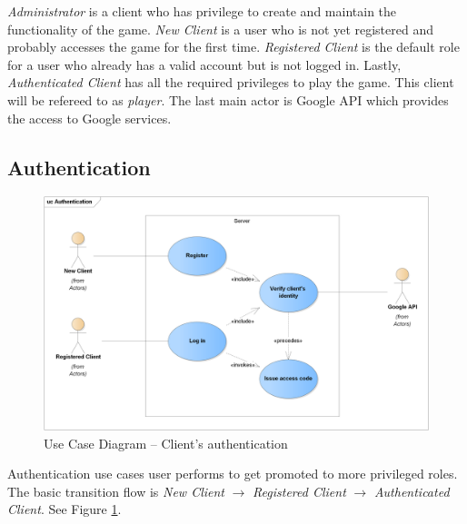 		\textit{Administrator} is a client who has privilege to create and maintain the functionality of the game. \textit{New Client} is a user who is not yet registered and probably accesses the game for the first time. \textit{Registered Client} is the default role for a user who already has a valid account but is not logged in. Lastly, \textit{Authenticated Client} has all the required privileges to play the game. This client will be refereed to as \textit{player}. The last main actor is Google API which provides the access to Google services. 		

	\subsection{Authentication}	
	\begin{figure}[h]	
		\includegraphics[width=\textwidth]{figures/UC_Authentication}
		\centering			
		\caption{Use Case Diagram -- Client's authentication}
		\label{fig:ucauth}
	\end{figure}
	\noindent Authentication use cases user performs to get promoted to more privileged roles. The basic transition flow is \textit{New Client} $\rightarrow$ \textit{Registered Client} $\rightarrow$ \textit{Authenticated Client}. See Figure \ref{fig:ucauth}.
	
